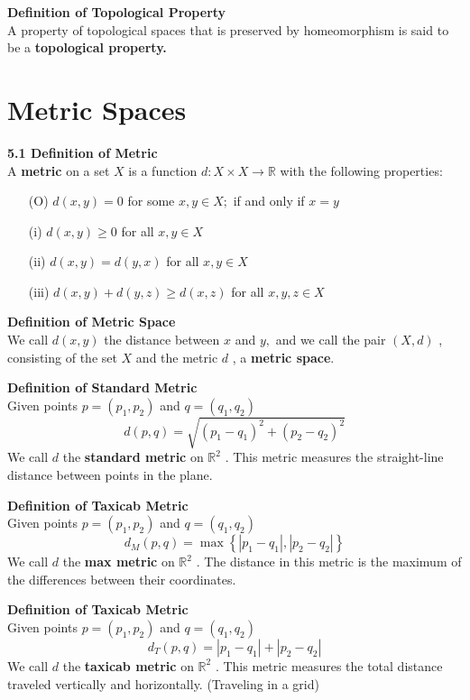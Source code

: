 \documentclass[12pt]{article}
\newenvironment{defn}[2][]{\par \medskip \noindent \textbf{#1 Definition of \large#2 \medskip \\}}{\rmfamily \medskip}
\begin{document}
	\begin{defn}{Topological Property}
		A property of topological spaces that is preserved by homeomorphism is
		said to be a \textbf{topological property.}
	\end{defn}

	\section{Metric Spaces}
	\begin{defn}[5.1]{Metric}
		A \textbf{metric} on a set $X$ is a function  $d : X \times X \rightarrow \mathbb { R }$ with the following properties:
		\begin{enumerate}
			\item[(O)]  $d ( x , y ) = 0$ for some $x , y \in X ;$ if and only if $x = y$
			\item[(i)] $d ( x , y ) \geq 0$ for all $x , y \in X$
			\item[(ii)]  $d ( x , y ) = d ( y , x )$ for all $x , y \in X$
			\item[(iii)] $d ( x , y ) + d ( y , z ) \geq d ( x , z )$ for all $x , y , z \in X$
		\end{enumerate}
	\end{defn}
	
	\begin{defn}{Metric Space}
		We call $d ( x , y )$ the distance between $x$ and $y ,$ and we call the pair $( X , d )$ , consisting of the set $X$ and the metric $d$ , a \textbf{metric space}.
	\end{defn}

	\begin{defn}{Standard Metric}
		Given points $ p = {(p_1,p_2)} $ and $ q = (q_1,q_2) $
		\[d ( p , q ) = \sqrt { \left( p _ { 1 } - q _ { 1 } \right) ^ { 2 } + \left( p _ { 2 } - q _ { 2 } \right) ^ { 2 } }\]
		We call $d$ the\textbf{ standard metric} on $\mathbb { R } ^ { 2 }$ . This metric measures the straight-line distance between points in the plane.
	\end{defn}

	\begin{defn}{Taxicab Metric}
		Given points $ p = {(p_1,p_2)} $ and $ q = (q_1,q_2) $
		\[d _ { M } ( p , q ) = \max \left\{ \left| p _ { 1 } - q _ { 1 } \right| , \left| p _ { 2 } - q _ { 2 } \right| \right\}\]
		We call $d$ the\textbf{ max metric} on $\mathbb { R } ^ { 2 }$ . The distance in this metric is the maximum of the differences between their coordinates.
	\end{defn}
		  
	\begin{defn}{Taxicab Metric}
		Given points $ p = {(p_1,p_2)} $ and $ q = (q_1,q_2) $
		\[d _ { T } ( p , q ) = \left| p _ { 1 } - q _ { 1 } \right| + \left| p _ { 2 } - q _ { 2 } \right|\]
		We call $d$ the\textbf{ taxicab metric} on $\mathbb { R } ^ { 2 }$ . This metric measures the total distance traveled vertically and horizontally. (Traveling in a grid)
	\end{defn}
		  
\end{document}
